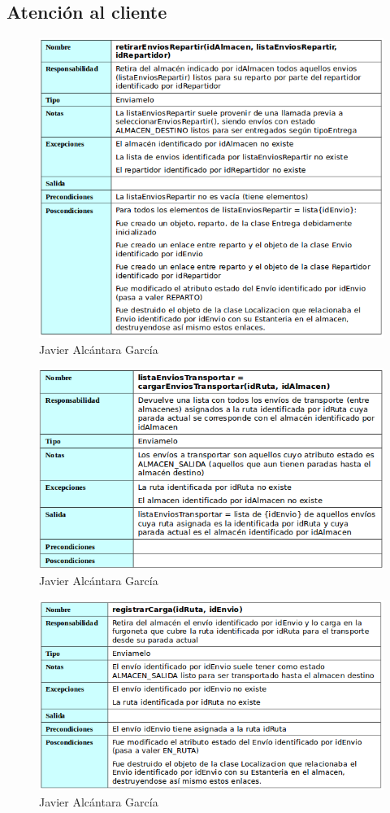 \subsection{Atención al cliente}
\begin{figure}[H]
	\centering
	\includegraphics[width=16cm]{13}
	\caption{Javier Alcántara García}
\end{figure}
\begin{figure}[H]
	\centering
	\includegraphics[width=16cm]{14}
	\caption{Javier Alcántara García}
\end{figure}
\begin{figure}[H]
	\centering
	\includegraphics[width=16cm]{15}
	\caption{Javier Alcántara García}
\end{figure}
